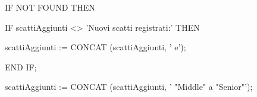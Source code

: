 \begin{flushleft}
\begin{description}
\begin{description}
\begin{description}
\begin{description}
                                \item IF NOT FOUND THEN
                                \begin{description}
                                    \item IF scattiAggiunti <> 'Nuovi scatti registrati:' THEN
                                    \begin{description}
                                        \item scattiAggiunti := CONCAT (scattiAggiunti, ' e');
                                    \end{description}
                                    \item END IF;
                                    \item scattiAggiunti := CONCAT (scattiAggiunti, ' "Middle" a "Senior"');
                                        

\end{description}
\end{description}
\end{description}
\end{description}
\end{description}
\end{flushleft}
